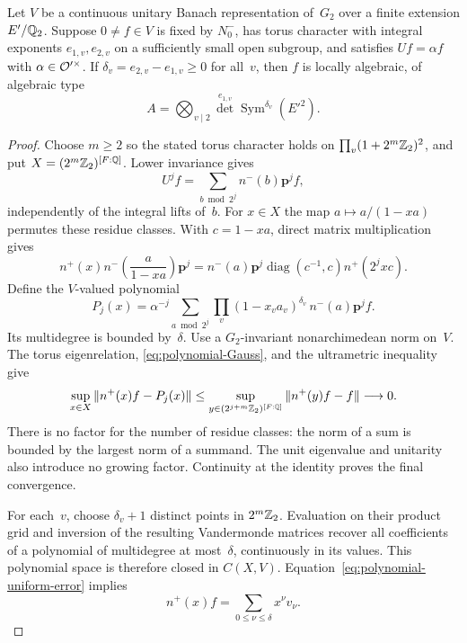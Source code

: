 \begin{lemma}\label{lem:polynomial-orbit}
Let $V$ be a continuous unitary Banach representation of~$G_2$ over a
finite extension $E'/\mathbb Q_2$.  Suppose $0\ne f\in V$ is fixed by
$N_0^-$, has torus character with integral exponents
$e_{1,v},e_{2,v}$ on a sufficiently small open subgroup, and satisfies
$Uf=\alpha f$ with $\alpha\in\mathcal O'^\times$.  If
$\delta_v=e_{2,v}-e_{1,v}\ge0$ for all~$v$, then $f$ is locally
algebraic, of algebraic type
\[
       A=\bigotimes_{v\mid2}
                \det^{e_{1,v}}\operatorname{Sym}^{\delta_v}(E'^2).
\]
\end{lemma}
\begin{proof}
Choose $m\ge2$ so the stated torus character holds on
$\prod_v(1+2^m\mathbb Z_2)^2$, and put
$X=(2^m\mathbb Z_2)^{[F:\mathbb Q]}$.  Lower invariance gives
\[
 U^jf=\sum_{b\bmod 2^j}n^-(b)\mathbf p^jf,
\]
independently of the integral lifts of~$b$.  For $x\in X$ the map
$a\mapsto a/(1-xa)$ permutes these residue classes.  With
$c=1-xa$, direct matrix multiplication gives
\begin{equation}\label{eq:polynomial-Gauss}
 n^+(x)n^-\!\left(\frac a{1-xa}\right)\mathbf p^j
 =n^-(a)\mathbf p^j
        \operatorname{diag}(c^{-1},c)n^+(2^jxc).
\end{equation}
Define the $V$-valued polynomial
\[
 P_j(x)=\alpha^{-j}\sum_{a\bmod2^j}
              \prod_v(1-x_va_v)^{\delta_v}\,
                    n^-(a)\mathbf p^jf.
\]
Its multidegree is bounded by~$\delta$.  Use a $G_2$-invariant
nonarchimedean norm on~$V$.  The torus eigenrelation,
\eqref{eq:polynomial-Gauss}, and the ultrametric inequality give
\begin{equation}\label{eq:polynomial-uniform-error}
 \sup_{x\in X}\|n^+(x)f-P_j(x)\|
 \le \sup_{y\in(2^{j+m}\mathbb Z_2)^{[F:\mathbb Q]}}
                         \|n^+(y)f-f\|\longrightarrow0.
\end{equation}
There is no factor for the number of residue classes: the norm of a
sum is bounded by the largest norm of a summand.  The unit eigenvalue
and unitarity also introduce no growing factor.  Continuity at the
identity proves the final convergence.

For each~$v$, choose $\delta_v+1$ distinct points in $2^m\mathbb Z_2$.
Evaluation on their product grid and inversion of the resulting
Vandermonde matrices recover all coefficients of a polynomial of
multidegree at most~$\delta$, continuously in its values.  This
polynomial space is therefore closed in $C(X,V)$.
Equation~\eqref{eq:polynomial-uniform-error} implies
\begin{equation}\label{eq:upper-orbit-polynomial}
                n^+(x)f=\sum_{0\le\nu\le\delta}x^\nu v_\nu.
\end{equation}


\end{proof}
